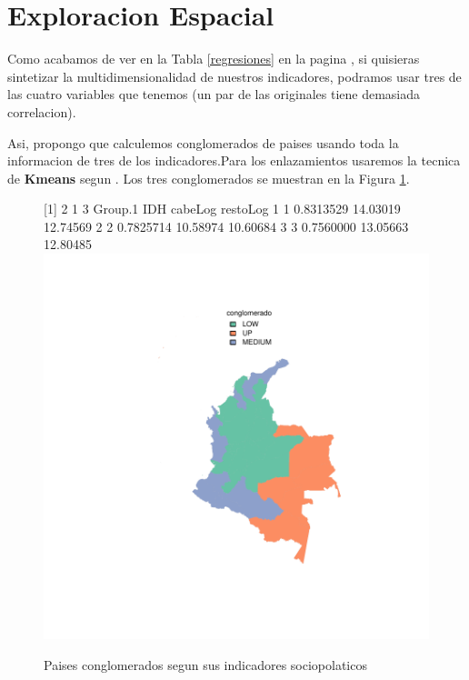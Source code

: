 \clearpage

\section{Exploracion Espacial}

Como acabamos de ver en la Tabla \ref{regresiones} en la pagina \pageref{regresiones}, si quisieras sintetizar la multidimensionalidad de nuestros indicadores, podramos usar tres de las cuatro variables que tenemos (un par de las originales tiene demasiada correlacion). 

Asi, propongo que calculemos conglomerados de paises usando toda la informacion de tres de los indicadores.Para los enlazamientos usaremos la tecnica de {\bf Kmeans} segun \cite{macqueen_methods_nodate}. Los tres conglomerados se muestran en la Figura \ref{clustmap}.






\begin{figure}[h]
\centering
\begin{adjustbox}{width=18cm,height=14cm,clip,trim=25cm 0cm 0cm 0cm}
[1] 2 1 3  Group.1       IDH  cabeLog restoLog
1       1 0.8313529 14.03019 12.74569
2       2 0.7825714 10.58974 10.60684
3       3 0.7560000 13.05663 12.80485\includegraphics{Proyecto_Final_regresion-plotMapf}
\end{adjustbox}
\caption{Paises conglomerados segun sus indicadores sociopolaticos}\label{clustmap}
\end{figure}

\clearpage

\endinput
